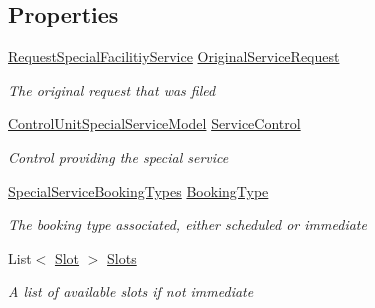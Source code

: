 \subsection*{Properties}
\begin{DoxyCompactItemize}
\item 
\hyperlink{class_general_health_care_elements_1_1_special_facility_1_1_request_special_facilitiy_service}{Request\+Special\+Facilitiy\+Service} \hyperlink{class_general_health_care_elements_1_1_special_facility_1_1_delegate_availabilities_for_request_a35ce2e582876eac29e90b6933fdd660b}{Original\+Service\+Request}
\begin{DoxyCompactList}\small\item\em The original request that was filed \end{DoxyCompactList}\item 
\hyperlink{class_general_health_care_elements_1_1_special_facility_1_1_control_unit_special_service_model}{Control\+Unit\+Special\+Service\+Model} \hyperlink{class_general_health_care_elements_1_1_special_facility_1_1_delegate_availabilities_for_request_a86724c75f7fd1fbb0a64ba406c11f71f}{Service\+Control}
\begin{DoxyCompactList}\small\item\em Control providing the special service \end{DoxyCompactList}\item 
\hyperlink{namespace_enums_a983d5bd1d6201551a5cc9c34c53d1af6}{Special\+Service\+Booking\+Types} \hyperlink{class_general_health_care_elements_1_1_special_facility_1_1_delegate_availabilities_for_request_a292782a7f13f112e87cf5fe53b51d82f}{Booking\+Type}
\begin{DoxyCompactList}\small\item\em The booking type associated, either scheduled or immediate \end{DoxyCompactList}\item 
List$<$ \hyperlink{class_general_health_care_elements_1_1_booking_models_1_1_slot}{Slot} $>$ \hyperlink{class_general_health_care_elements_1_1_special_facility_1_1_delegate_availabilities_for_request_ab8365cc2b152e220f4bcac76274bcb9e}{Slots}
\begin{DoxyCompactList}\small\item\em A list of available slots if not immediate \end{DoxyCompactList}\item 

\end{DoxyCompactItemize}
